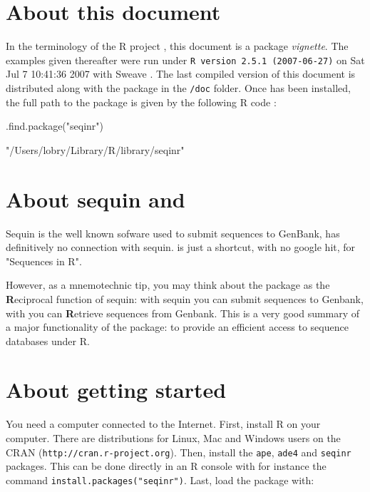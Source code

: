 \documentclass{article}
\begin{document}
\section{About this document}

In the terminology of the R project \cite{R, RfromR}, this document is a package \emph{vignette}.
The examples given thereafter were run under \texttt{R version 2.5.1 (2007-06-27)}
on Sat Jul  7 10:41:36 2007 with Sweave \cite{Sweave}.
The last compiled version of this document is distributed along with the \seqinr{}
package in the \texttt{/doc} folder. Once \seqinr{} has been installed, the
full path to the package is given by the following R code :

\begin{Schunk}
\begin{Sinput}
 .find.package("seqinr")
\end{Sinput}
\begin{Soutput}
[1] "/Users/lobry/Library/R/library/seqinr"
\end{Soutput}
\end{Schunk}


\section{About sequin and \seqinr{}}

Sequin is the well known sofware used to submit sequences to GenBank, \seqinr{}
has definitively no connection with sequin. \seqinr{} is just a shortcut, with
no google hit, for "Sequences in R".

However, as a mnemotechnic tip, you may think about the \seqinr{} package
as the {\bf{R}}eciprocal function of sequin: with sequin you can submit sequences
to Genbank, with \seqinr{} you can {\bf{R}}etrieve sequences from Genbank. This is
a very good summary of a major functionality of the \seqinr{} package: to
provide an efficient access to sequence databases under R.

\section{About getting started}

You need a computer connected to the Internet. First, install R on your computer.
There are distributions for Linux, Mac and Windows users
on the CRAN (\texttt{http://cran.r-project.org}). Then, install the \texttt{ape}, 
\texttt{ade4} and \texttt{seqinr} packages. This can be done directly in an R console
with for instance the command \texttt{install.packages("seqinr")}. 
Last, load the \seqinr{} package with:
\end{document}

